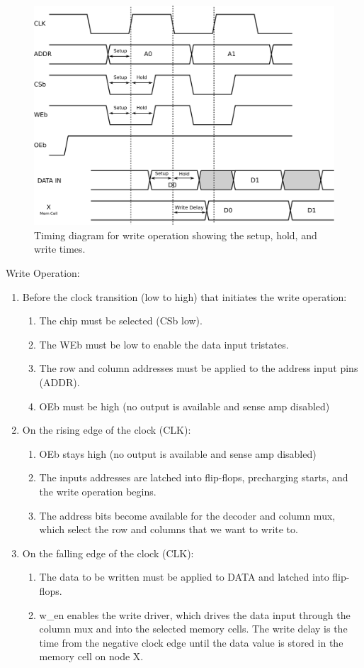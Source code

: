 \begin{figure}[tb]
\centering
\includegraphics[scale=.9]{./figs/timing_write.pdf}
\caption{Timing diagram for write operation showing the setup, hold, and write times.}
\label{fig:write}
\end{figure}



Write Operation:
\begin{enumerate}
\setlength{\itemsep}{0pt}
 \item Before the clock transition (low to high) that initiates the write operation:
  \begin{enumerate}
	\item The chip must be selected (CSb low).
	\item The WEb must be low to enable the data input tristates.
	\item The row and column addresses must be applied to the address input pins (ADDR).
	\item OEb must be high (no output is available and sense amp disabled)
  \end{enumerate}
 \item On the rising edge of the clock (CLK):
   \begin{enumerate}
	\item OEb stays high (no output is available and sense amp disabled)
	\item The inputs addresses are latched into flip-flops, precharging starts, and the write operation begins.
	\item The address bits become available for the decoder and column mux, which select the row and columns that we want to write to.
  \end{enumerate}	         
 \item On the falling edge of the clock (CLK):
   \begin{enumerate}
	\item The data to be written must be applied to DATA and latched into flip-flops.
	\item w\_en enables the write driver, which drives the data input through the column mux and into the selected memory cells.  The write delay is the time from the negative clock edge until the data value is stored in the memory cell on node X.
   \end{enumerate}
\end{enumerate}


